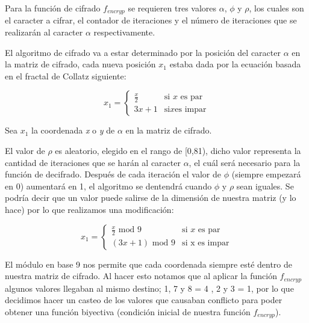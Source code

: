 Para la funci\'on de cifrado $f_{encryp}$ se requieren tres valores $\alpha$, $\phi$ y $\rho$, los cuales son el caracter a cifrar, el contador de iteraciones y el n\'umero de iteraciones que se realizar\'an al caracter $\alpha$ 
respectivamente.

El algoritmo de cifrado va a estar determinado por la posici\'on del caracter $\alpha$ en la matriz de cifrado, cada nueva posici\'on $x_{1}$ estaba dada por la ecuaci\'on basada en el fractal de Collatz \cite{Labelle} siguiente:

\[ x_{1} = 
\begin{cases} 
	\frac{x}{2} & \text {si } x \text { es par} \\ 
	3x+1 & \text {si} x \text {es impar} 
\end{cases} 
\] 

Sea $x_{1}$ la coordenada \emph{x} o \emph{y} de $\alpha$ en la matriz de cifrado.

El valor de $\rho$ es aleatorio, elegido en el rango de [0,81), dicho valor representa la cantidad de iteraciones que se har\'an al caracter $\alpha$, el cu\'al ser\'a necesario para la funci\'on de decifrado.
Despu\'es de cada iteraci\'on el valor de $\phi$ (siempre empezar\'a en 0) aumentar\'a en 1, el algoritmo se dentendr\'a cuando $\phi$ y $\rho$ sean iguales.
Se podr\'ia decir que un valor puede salirse de la dimensi\'on de nuestra matriz (y lo hace) por lo que realizamos una modificaci\'on: 

\[ x_{1} = 
\begin{cases} 
	\frac{x}{2} \text { mod  9} & \text {si } x \text { es par} \\ 
	(3x+1) \text { mod 9} & \text {si  x} \text { es impar} 
\end{cases} 
\] 
  

El m\'odulo en base 9 nos permite que cada coordenada siempre est\'e dentro de nuestra matriz de cifrado.
Al hacer esto notamos que al aplicar la funci\'on $f_{encryp}$ algunos valores llegaban al mismo destino; 1, 7 y 8 = 4 , 2 y 3 = 1, por lo que decidimos hacer un casteo de los valores que causaban conflicto para poder obtener una funci\'on biyectiva (condici\'on inicial de nuestra funci\'on $f_{encryp}$).
